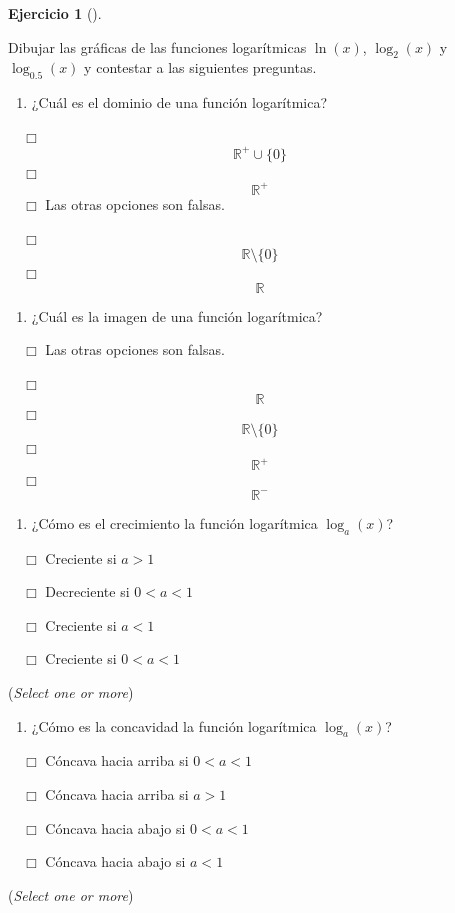 \documentclass[
  a4paper,
]{scrreport}
\providecommand{\tightlist}{%
  \setlength{\itemsep}{0pt}\setlength{\parskip}{0pt}}\usepackage{longtable,booktabs,array}
\theoremstyle{definition}
\newtheorem{exercise}{Ejercicio}[chapter]
\theoremstyle{remark}
\begin{document}
\begin{exercise}[]\protect\hypertarget{exr-funciones-logaritmicas}{}\label{exr-funciones-logaritmicas}

Dibujar las gráficas de las funciones logarítmicas \(\ln(x)\),
\(\log_2(x)\) y \(\log_{0.5}(x)\) y contestar a las siguientes
preguntas.

\begin{enumerate}
\def\labelenumi{\alph{enumi}.}
\tightlist
\item
  ¿Cuál es el dominio de una función logarítmica?
\end{enumerate}

${\quad\Box}$ $$\mathbb{R}^+\cup \{0\}$$
${\quad\Box}$ $$\mathbb{R}^+$$
${\quad\Box}$ Las otras opciones son falsas.

${\quad\Box}$ $$\mathbb{R}\setminus\{0\}$$
${\quad\Box}$ $$\mathbb{R}$$

\begin{enumerate}
\def\labelenumi{\alph{enumi}.}
\setcounter{enumi}{1}
\tightlist
\item
  ¿Cuál es la imagen de una función logarítmica?
\end{enumerate}

${\quad\Box}$ Las otras opciones son falsas.

${\quad\Box}$ $$\mathbb{R}$$
${\quad\Box}$ $$\mathbb{R}\setminus\{0\}$$
${\quad\Box}$ $$\mathbb{R}^+$$
${\quad\Box}$ $$\mathbb{R}^-$$

\begin{enumerate}
\def\labelenumi{\alph{enumi}.}
\setcounter{enumi}{2}
\tightlist
\item
  ¿Cómo es el crecimiento la función logarítmica \(\log_a(x)\)?
\end{enumerate}

${\quad\Box}$ Creciente si $a>1$

${\quad\Box}$ Decreciente si $0 < a <1$

${\quad\Box}$ Creciente si $a<1$

${\quad\Box}$ Creciente si $0 < a < 1$

(\emph{Select one or more})

\begin{enumerate}
\def\labelenumi{\alph{enumi}.}
\setcounter{enumi}{3}
\tightlist
\item
  ¿Cómo es la concavidad la función logarítmica \(\log_a(x)\)?
\end{enumerate}

${\quad\Box}$ Cóncava hacia arriba si $0 < a < 1$

${\quad\Box}$ Cóncava hacia arriba si $a>1$

${\quad\Box}$ Cóncava hacia abajo si $0 < a < 1$

${\quad\Box}$ Cóncava hacia abajo si $a<1$

(\emph{Select one or more})

\end{exercise}
\end{document}
